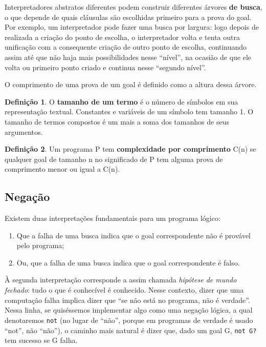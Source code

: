 \documentclass{article}
\theoremstyle{definition}
\newtheorem{definition}{Definição}[section]
\theoremstyle{remark}
\begin{document}
Interpretadores abstratos diferentes podem construir diferentes árvores \textbf{de busca}, o que depende de quais cláusulas são escolhidas primeiro para a prova do goal. Por exemplo, um interpretador pode fazer uma busca por largura: logo depois de realizada a criação do ponto de escolha, o interpretador volta e tenta outra unificação com a consequente criação de outro ponto de escolha, continuando assim até que não haja mais possibilidades nesse ``nível'', na ocasião de que ele
volta ou primeiro ponto criado e continua nesse ``segundo nível''.

O comprimento de uma prova de um goal é definido como a altura dessa árvore.

\begin{definition} O \textbf{tamanho de um termo} é o número de símbolos em sua representação textual. Constantes e variáveis de um símbolo tem tamanho 1. O tamanho de termos compostos é um mais a soma dos tamanhos de seus argumentos.
\end{definition}

\begin{definition} Um programa P tem \textbf{complexidade por comprimento} C(n) se qualquer goal de tamanho n no significado de P tem alguma prova de comprimento menor ou igual a C(n).
\end{definition}

\subsection{Negação}

Existem duas interpretações fundamentais para um programa lógico:
\begin{enumerate}
  \item Que a falha de uma busca indica que o goal correspondente não é provável pelo programa;
  \item Ou, que a falha de uma busca indica que o goal correspondente é falso.
\end{enumerate}

    À segunda interpretação corresponde a assim chamada \textit{hipótese de mundo fechado}: tudo o que é conhecível é conhecido. Nesse contexto, dizer que uma computação falha implica dizer que ``se não está no programa, não é verdade''. Nessa linha, se quiséssemos implementar algo como uma negação lógica, a qual denotaremos {\tt not} (no lugar de ``não'', porque em programas de verdade é usado ``not'', não ``não''), o caminho mais natural é dizer que, dado um goal G, {\tt not G?} tem sucesso se G falha.
\end{document}
